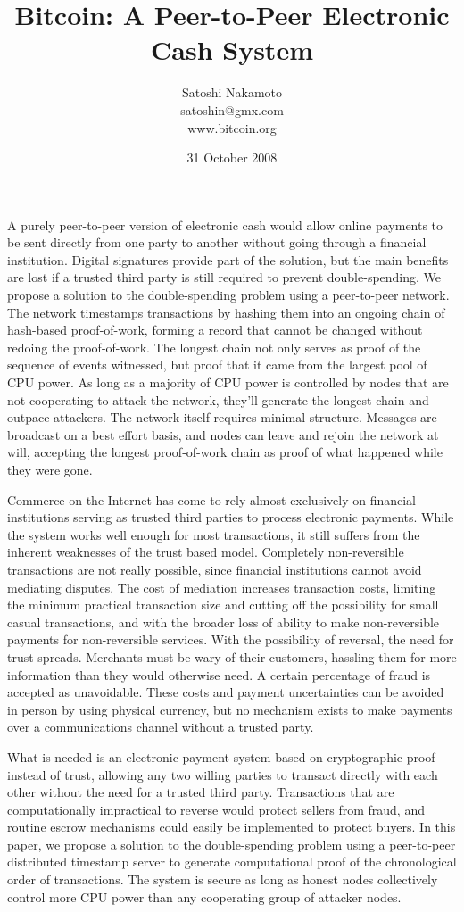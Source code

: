 \documentclass{article}
\title{Bitcoin: A Peer-to-Peer Electronic Cash System}
\author{Satoshi Nakamoto\\satoshin@gmx.com\\www.bitcoin.org}
\date{31 October 2008}
\begin{document}
\maketitle

A purely peer-to-peer version of electronic cash would allow online payments to be sent directly from one party to another without going through a financial institution. Digital signatures provide part of the solution, but the main benefits are lost if a trusted third party is still required to prevent double-spending. We propose a solution to the double-spending problem using a peer-to-peer network. The network timestamps transactions by hashing them into an ongoing chain of hash-based proof-of-work, forming a record that cannot be changed without redoing the proof-of-work. The longest chain not only serves as proof of the sequence of events witnessed, but proof that it came from the largest pool of CPU power. As long as a majority of CPU power is controlled by nodes that are not cooperating to attack the network, they'll generate the longest chain and outpace attackers. The network itself requires minimal structure. Messages are broadcast on a best effort basis, and nodes can leave and rejoin the network at will, accepting the longest proof-of-work chain as proof of what happened while they were gone.

Commerce on the Internet has come to rely almost exclusively on financial institutions serving as trusted third parties to process electronic payments. While the system works well enough for most transactions, it still suffers from the inherent weaknesses of the trust based model. Completely non-reversible transactions are not really possible, since financial institutions cannot avoid mediating disputes. The cost of mediation increases transaction costs, limiting the minimum practical transaction size and cutting off the possibility for small casual transactions, and with the broader loss of ability to make non-reversible payments for non-reversible services. With the possibility of reversal, the need for trust spreads. Merchants must be wary of their customers, hassling them for more information than they would otherwise need. A certain percentage of fraud is accepted as unavoidable. These costs and payment uncertainties can be avoided in person by using physical currency, but no mechanism exists to make payments over a communications channel without a trusted party.

What is needed is an electronic payment system based on cryptographic proof instead of trust, allowing any two willing parties to transact directly with each other without the need for a trusted third party. Transactions that are computationally impractical to reverse would protect sellers from fraud, and routine escrow mechanisms could easily be implemented to protect buyers. In this paper, we propose a solution to the double-spending problem using a peer-to-peer distributed timestamp server to generate computational proof of the chronological order of transactions. The system is secure as long as honest nodes collectively control more CPU power than any cooperating group of attacker nodes.
\end{document}
